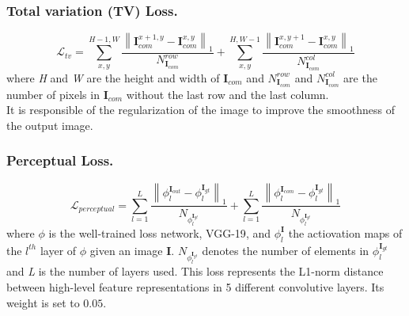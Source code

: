 \documentclass[10pt,twocolumn,letterpaper]{article}
\newcommand\norm[1]{\left\lVert#1\right\rVert}
\begin{document}
\subsubsection{Total variation (TV) Loss.}
\begin{dmath}
    \mathcal{L}_{tv} = \sum^{H-1,W}_{x,y} \frac{\norm{ \mathbf{I}^{x+1,y}_{com}
    - \mathbf{I}^{x,y}_{com} }_1}{N^{row}_{\mathbf{I}_{com}}} +
    \sum^{H,W-1}_{x,y} \frac{\norm{ \mathbf{I}^{x,y+1}_{com} -
    \mathbf{I}^{x,y}_{com} }_1}{N^{col}_{\mathbf{I}_{com}}}
\end{dmath}
where \textit{H} and \textit{W} are the height and width of $\mathbf{I}_{com}$
and $N^{row}_{\mathbf{I}_{com}}$ and $N^{col}_{\mathbf{I}_{com}}$ are the number
of pixels in $\mathbf{I}_{com}$ without the last row and the last column.
\\
It is responsible of the regularization of the image to improve the smoothness
of the output image.

\subsubsection{Perceptual Loss.}
\begin{dmath}
    \mathcal{L}_{perceptual} = \sum^L_{l=1} \frac{\norm{
      \phi^{\mathbf{I}_{out}}_l - \phi^{\mathbf{I}_{gt}}_l
    }_1}{N_{\phi^{\mathbf{I}_{gt}}_l}} + \sum^L_{l=1} \frac{\norm{
      \phi^{\mathbf{I}_{com}}_l - \phi^{\mathbf{I}_{gt}}_l
    }_1}{N_{\phi^{\mathbf{I}_{gt}}_l}}
\end{dmath}
where \(\phi\) is the well-trained loss network, VGG-19\cite{simonyan2014very},
and \(\phi^{\mathbf{I}}_l\) the actiovation maps of the \(l^{th}\) layer of
\(\phi\) given an image \(\mathbf{I}\).
\(N_{\phi^{\mathbf{I}_{gt}}_l}\) denotes the number of elements in
\(\phi^{\mathbf{I}_{gt}}_l\) and \textit{L} is the number of layers used.
This loss represents the L1-norm distance between high-level feature
representations in 5 different convolutive layers. Its weight is set to
\(0.05\).
\end{document}
